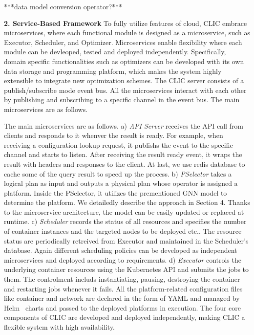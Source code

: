 ***data model conversion operator?***
 
\textbf{2. Service-Based Framework} To fully utilize features of cloud, CLIC embrace microservices, where each functional module is designed as a microservice, such as Executor, Scheduler, and Optimizer.
Microservices enable flexibility where each module can be devleoped, tested and deployed independently.
Specifically, domain specific functionalities such as optimizers can be developed with its own data storage and programming platform, which makes the system highly extensible to integrate new optimization schemes.
The CLIC server consists of a publish/subscribe mode event bus. All the microservices interact with each other by publishing and subscribing to a specific channel in the event bus. The main microservices are as follows.

The main microservices are as follows. a) \textit{API Server} receives the API call from clients and responds to it whenver the result is ready. For example, when receiving a configuration lookup request, it publishs the event to the specific channel and starts to listen. After receiving the result ready event, it wraps the result with headers and responses to the client. At last, we use redis database to cache some of the query result to speed up the process.
b) \textit{PSelector} takes a logical plan as input and outputs a physical plan whose operator is assigned a platform. Inside the PSelector, it utilizes the prementioned GNN model to determine the platform. We detailedly describe the approach in Section 4. Thanks to the microservice architecture, the model can be easily updated or replaced at runtime. c) \textit{Scheduler} records the status of all resources and specifies the number of container instances and the targeted nodes to be deployed etc.. The resource status are periodically retreived from Executor and maintained in the Scheduler's database. Again different scheduling policies can be developed as independent microservices and deployed according to requirements.
d) \textit{Executor} controls the underlying container resources using the Kubernetes API and submits the jobs to them. The controlment includs instantiating, pausing, destroying the container and restarting jobs whenever it fails. All the platform-related configuration files like container and network are declared in the form of YAML and managed by Helm~\cite{} charts and passed to the deployed platforms in execution.
The four core components of CLIC are developed and deployed independently, making CLIC a flexible system with high availability.



